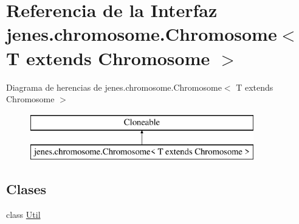 \hypertarget{interfacejenes_1_1chromosome_1_1_chromosome_3_01_t_01extends_01_chromosome_01_4}{\section{Referencia de la Interfaz jenes.\-chromosome.\-Chromosome$<$ T extends Chromosome $>$}
\label{interfacejenes_1_1chromosome_1_1_chromosome_3_01_t_01extends_01_chromosome_01_4}
}
Diagrama de herencias de jenes.\-chromosome.\-Chromosome$<$ T extends Chromosome $>$\begin{figure}[H]
\begin{center}
\leavevmode
\includegraphics[height=2.000000cm]{interfacejenes_1_1chromosome_1_1_chromosome_3_01_t_01extends_01_chromosome_01_4}
\end{center}
\end{figure}
\subsection*{Clases}
\begin{DoxyCompactItemize}
\item 
class \hyperlink{classjenes_1_1chromosome_1_1_chromosome_3_01_t_01extends_01_chromosome_01_4_1_1_util}{Util}
\end{DoxyCompactItemize}
